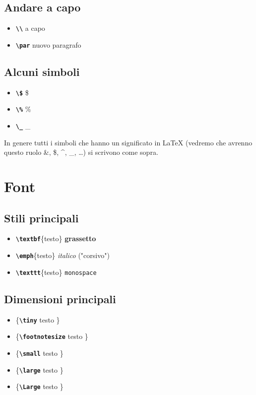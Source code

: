   \subsection{Andare a capo}
  \begin{itemize}
    \item{\texttt{\textbf{\textbackslash\textbackslash}} a capo}
    \item{\texttt{\textbf{\textbackslash par}} nuovo paragrafo}
  \end{itemize}
\subsection{Alcuni simboli}
  \begin{itemize}
    \item{\texttt{\textbf{\textbackslash\$}} \$}
    \item{\texttt{\textbf{\textbackslash\%}} \%}
    \item{\texttt{\textbf{\textbackslash\_}} \_}
  \end{itemize}
  In genere tutti i simboli che hanno un significato in \LaTeX{} (vedremo che avrenno questo ruolo \&, \$, \^{}, \_, \dots) si scrivono come sopra.

\section{Font}
  \subsection{Stili principali}
  \begin{itemize}
    \item{\texttt{\textbf{\textbackslash textbf}}\{testo\} \textbf{grassetto}}
    \item{\texttt{\textbf{\textbackslash emph}}\{testo\} \emph{italico} ("corsivo")}
    \item{\texttt{\textbf{\textbackslash texttt}}\{testo\} \texttt{monospace}}
  \end{itemize}
  \subsection{Dimensioni principali}
  \begin{itemize}
    \item{\{\texttt{\textbf{\textbackslash tiny}} \tiny testo \}}
    \item{\{\texttt{\textbf{\textbackslash footnotesize}} \footnotesize testo \}}
    \item{\{\texttt{\textbf{\textbackslash small}} \small testo \}}
    \item{\{\texttt{\textbf{\textbackslash large}} \large testo \}}
    \item{\{\texttt{\textbf{\textbackslash Large}} \Large testo \}}
  \end{itemize}